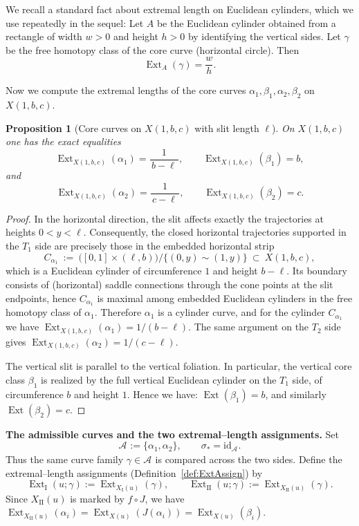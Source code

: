 \documentclass[a4paper,12pt]{amsart}
\DeclareMathOperator{\Ext}{Ext}
\newcommand{\id}{\mathrm{id}}
\theoremstyle{plain}
\newtheorem{proposition}[theorem]{Proposition}
\theoremstyle{definition}
\begin{document}
\medskip
We recall a standard fact about extremal length on Euclidean cylinders, which we use repeatedly in the sequel:  
Let \(A\) be the Euclidean cylinder obtained from a rectangle of width \(w>0\) and height \(h>0\) by
identifying the vertical sides.  Let \(\gamma\) be the free homotopy class of the core curve (horizontal
circle).  Then
\[
\Ext_A(\gamma)=\frac{w}{h}.
\]

Now we compute the extremal lengths of the core curves \(\alpha_1,\beta_1,\alpha_2,\beta_2\) on \(X(1,b,c)\).

\begin{proposition}[Core curves on \(X(1,b,c)\) with slit length \(\ell\)]\label{prop:ExtCorePlumbing}
On \(X(1,b,c)\) one has the exact equalities
\[
\Ext_{X(1,b,c)}(\alpha_1)=\frac{1}{\,b-\ell\,},\qquad
\Ext_{X(1,b,c)}(\beta_1)=b,
\]
and
\[
\Ext_{X(1,b,c)}(\alpha_2)=\frac{1}{\,c-\ell\,},\qquad
\Ext_{X(1,b,c)}(\beta_2)=c.
\]
\end{proposition}

\begin{proof}
In the horizontal direction, the slit affects exactly the trajectories at heights \(0<y<\ell\).
Consequently, the closed horizontal trajectories supported in the \(T_1\) side are precisely those in the
embedded horizontal strip
\[
C_{\alpha_1}\ :=\ \bigl([0,1]\times(\ell,b)\bigr)/\{(0,y)\sim(1,y)\}\ \subset\ X(1,b,c),
\]
which is a Euclidean cylinder of circumference \(1\) and height \(b-\ell\).  Its boundary consists of
(horizontal) saddle connections through the cone points at the slit endpoints, hence \(C_{\alpha_1}\) is
maximal among embedded Euclidean cylinders in the free homotopy class of \(\alpha_1\).
Therefore \(\alpha_1\) is a cylinder curve, and  for the cylinder \(C_{\alpha_1}\) we have
\(\Ext_{X(1,b,c)}(\alpha_1)=1/(b-\ell)\).
The same argument on the \(T_2\) side gives \(\Ext_{X(1,b,c)}(\alpha_2)=1/(c-\ell)\).

\smallskip


The vertical slit is parallel to the vertical foliation.  In particular, the vertical core class
\(\beta_1\) is realized by the full vertical Euclidean cylinder on the \(T_1\) side, of circumference \(b\)
and height \(1\).  Hence we have: \(\Ext(\beta_1)=b\), and similarly \(\Ext(\beta_2)=c\).
\end{proof}

\medskip
\noindent
\textbf{The admissible curves and the two extremal--length assignments.}\;
Set
\[
\mathcal A_{}:=\{\alpha_1,\alpha_2\},
\qquad
\sigma_\ast=\id_{\mathcal A_{}}.
\]
Thus the same curve family \(\gamma\in\mathcal A_{}\) is compared across the two sides.
Define the extremal--length assignments (Definition~\ref{def:ExtAssign}) by
\[
\Ext_{\mathrm{I}}(u;\gamma):=\Ext_{X_{\mathrm{I}}(u)}(\gamma),
\qquad
\Ext_{\mathrm{II}}(u;\gamma):=\Ext_{X_{\mathrm{II}}(u)}(\gamma).
\]
Since \(X_{\mathrm{II}}(u)\) is marked by \(f\circ J\), we have
\(
\Ext_{X_{\mathrm{II}}(u)}(\alpha_i)=\Ext_{X(u)}(J(\alpha_i))=\Ext_{X(u)}(\beta_i).
\)
\end{document}
